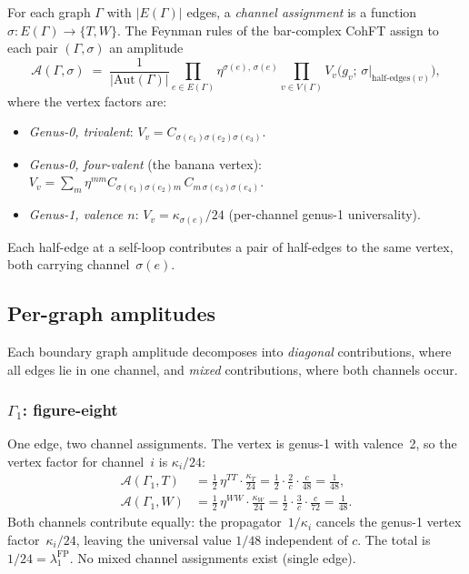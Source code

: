 \documentclass[11pt]{article}
\theoremstyle{plain}
\theoremstyle{definition}
\theoremstyle{remark}
\begin{document}
For each graph $\Gamma$ with $|E(\Gamma)|$ edges, a \emph{channel
assignment} is a function $\sigma \colon E(\Gamma) \to \{T, W\}$.
The Feynman rules of the bar-complex CohFT assign to each pair
$(\Gamma, \sigma)$ an amplitude
\begin{equation}\label{eq:feynman-rule}
\mathcal{A}(\Gamma, \sigma)
\;=\;
\frac{1}{|\mathrm{Aut}(\Gamma)|}
\prod_{e \in E(\Gamma)} \eta^{\sigma(e),\, \sigma(e)}
\prod_{v \in V(\Gamma)} V_v\bigl(g_v;\, \sigma|_{\mathrm{half\text{-}edges}(v)}\bigr),
\end{equation}
where the vertex factors are:
\begin{itemize}
\item \emph{Genus-0, trivalent}: $V_v = C_{\sigma(e_1)\sigma(e_2)\sigma(e_3)}$.
\item \emph{Genus-0, four-valent} (the banana vertex):
 $V_v = \sum_m \eta^{mm} C_{\sigma(e_1)\sigma(e_2)m}\,
 C_{m\,\sigma(e_3)\sigma(e_4)}$.
\item \emph{Genus-1, valence $n$}:
 $V_v = \kappa_{\sigma(e)}/24$ (per-channel genus-1 universality).
\end{itemize}
Each half-edge at a self-loop contributes a pair of half-edges to
the same vertex, both carrying channel~$\sigma(e)$.


\subsection{Per-graph amplitudes}
\label{subsec:per-graph-amplitudes}

Each boundary graph amplitude decomposes into \emph{diagonal}
contributions, where all edges lie in one channel, and \emph{mixed}
contributions, where both channels occur.

\subsubsection*{$\Gamma_1$: figure-eight}

One edge, two channel assignments. The vertex is genus-1 with
valence~2, so the vertex factor for channel~$i$ is $\kappa_i/24$:
\begin{align}
\mathcal{A}(\Gamma_1, T) &= \tfrac{1}{2}\, \eta^{TT} \cdot
 \tfrac{\kappa_T}{24}
 = \tfrac{1}{2} \cdot \tfrac{2}{c} \cdot \tfrac{c}{48}
 = \tfrac{1}{48}, \label{eq:fig-eight-T}\\
\mathcal{A}(\Gamma_1, W) &= \tfrac{1}{2}\, \eta^{WW} \cdot
 \tfrac{\kappa_W}{24}
 = \tfrac{1}{2} \cdot \tfrac{3}{c} \cdot \tfrac{c}{72}
 = \tfrac{1}{48}. \label{eq:fig-eight-W}
\end{align}
Both channels contribute equally: the propagator~$1/\kappa_i$ cancels
the genus-1 vertex factor~$\kappa_i/24$, leaving the universal value
$1/48$ independent of $c$. The total is $1/24 = \lambda_1^{\mathrm{FP}}$.
No mixed channel assignments exist (single edge).
\end{document}
